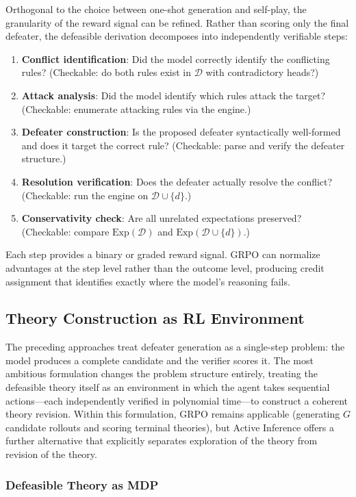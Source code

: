 \documentclass[11pt]{article}
\newcommand{\D}{\mathcal{D}}
\newcommand{\Exp}{\mathrm{Exp}}
\begin{document}
Orthogonal to the choice between one-shot generation and self-play, the granularity of the reward signal can be refined. Rather than scoring only the final defeater, the defeasible derivation decomposes into independently verifiable steps:
\begin{enumerate}[nosep]
    \item \textbf{Conflict identification}: Did the model correctly identify the conflicting rules? (Checkable: do both rules exist in $\D$ with contradictory heads?)
    \item \textbf{Attack analysis}: Did the model identify which rules attack the target? (Checkable: enumerate attacking rules via the engine.)
    \item \textbf{Defeater construction}: Is the proposed defeater syntactically well-formed and does it target the correct rule? (Checkable: parse and verify the defeater structure.)
    \item \textbf{Resolution verification}: Does the defeater actually resolve the conflict? (Checkable: run the engine on $\D \cup \{d\}$.)
    \item \textbf{Conservativity check}: Are all unrelated expectations preserved? (Checkable: compare $\Exp(\D)$ and $\Exp(\D \cup \{d\})$.)
\end{enumerate}

Each step provides a binary or graded reward signal. GRPO can normalize advantages at the step level rather than the outcome level, producing credit assignment that identifies exactly where the model's reasoning fails.

\subsection{Theory Construction as RL Environment}

The preceding approaches treat defeater generation as a single-step problem: the model produces a complete candidate and the verifier scores it. The most ambitious formulation changes the problem structure entirely, treating the defeasible theory itself as an environment in which the agent takes sequential actions---each independently verified in polynomial time---to construct a coherent theory revision. Within this formulation, GRPO remains applicable (generating $G$ candidate rollouts and scoring terminal theories), but Active Inference offers a further alternative that explicitly separates exploration of the theory from revision of the theory.

\subsubsection{Defeasible Theory as MDP}
\end{document}
